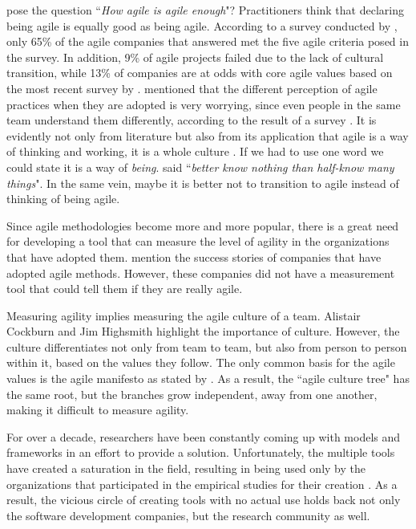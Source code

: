 \citet{comparative_agility} pose the question ``\textit{How agile is agile enough}"? Practitioners think that declaring being agile is equally good as being agile. According to a survey conducted by \citet{ambysoft}, only 65\% of the agile companies that answered met the five agile criteria posed in the survey. In addition, 9\% of agile projects failed due to the lack of cultural transition, while 13\% of companies are at odds with core agile values based on the most recent survey by \citet{versionOne}. \citet{poonacha} mentioned that the different perception of agile practices when they are adopted is very worrying, since even people in the same team understand them differently, according to the result of a survey \cite{ambler}. It is evidently not only from literature but also from its application that agile is a way of thinking and working, it is a whole culture \cite{poonacha}. If we had to use one word we could state it is a way of \textit{being}. \citet{Nietzsche} said ``\textit{better know nothing than half-know many things}". In the same vein, maybe it is better not to transition to agile instead of thinking of being agile. 

Since agile methodologies become more and more popular, there is a great need for developing a tool that can measure the level of agility in the organizations that have adopted them. \citet{sidky} mention the success stories of companies that have adopted agile methods. However, these companies did not have a measurement tool that could tell them if they are really agile.

Measuring agility implies measuring the agile culture of a team. Alistair Cockburn \cite{cockburn2002agile, Cockburn-poetry} and Jim Highsmith \cite{Highsmith:2002} highlight the importance of culture. However, the culture  differentiates not only from team to team, but also from person to person within it, based on the values they follow. The only common basis for the agile values is the agile manifesto\cite{beck2001agile} as stated by \citet{Ingalls}. As a result, the ``agile culture tree" has the same root, but the branches grow independent, away from one another, making it difficult to measure agility.

For over a decade, researchers have been constantly coming up with models and frameworks in an effort to provide a solution. Unfortunately, the multiple tools have created a saturation in the field, resulting in being used only by the organizations that participated in the empirical studies for their creation \cite{samireh_jalali_dissertation, jalali_angelis}. As a result, the vicious circle of creating tools with no actual use holds back not only the software development companies, but the research community as well.

